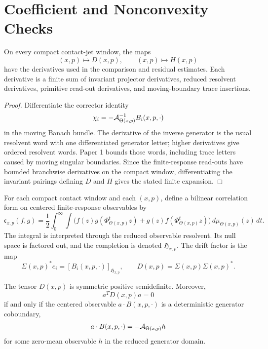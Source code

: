 \section{Coefficient and Nonconvexity Checks}

\begin{proposition}
\label{prop:supp_coefficient_differentiability}
On every compact contact-jet window, the maps
\[
  (x,p)\mapsto D(x,p),\qquad (x,p)\mapsto H(x,p)
\]
have the derivatives used in the comparison and residual estimates.  Each
derivative is a finite sum of invariant projector derivatives, reduced
resolvent derivatives, primitive read-out derivatives, and moving-boundary
trace insertions.
\end{proposition}

\begin{proof}
Differentiate the corrector identity
\[
  \chi_i=-\mathcal A_{\Theta(x,p)}^{-1}B_i(x,p,\cdot)
\]
in the moving Banach bundle.  The derivative of the inverse generator is the
usual resolvent word with one differentiated generator letter; higher
derivatives give ordered resolvent words.  Paper 1 bounds those words,
including trace letters caused by moving singular boundaries.  Since the
finite-response read-outs have bounded branchwise derivatives on the compact
window, differentiating the invariant pairings defining \(D\) and \(H\) gives
the stated finite expansion.
\end{proof}

\begin{definition}
\label{def:supp_correlation_hilbert_bundle}
For each compact contact window and each \((x,p)\), define a bilinear
correlation form on centered finite-response observables by
\[
  \mathfrak c_{x,p}(f,g)
  =
  \frac12\int_0^\infty
  \int \bigl(f(z)g(\Phi_{\Theta(x,p)}^t z)
      +g(z)f(\Phi_{\Theta(x,p)}^t z)\bigr)
  \,d\mu_{\Theta(x,p)}(z)\,dt .
\]
The integral is interpreted through the reduced observable resolvent.  Its null
space is factored out, and the completion is denoted
\(\mathfrak H_{x,p}\).  The drift factor is the map
\[
  \Sigma(x,p)^*e_i=[B_i(x,p,\cdot)]_{\mathfrak H_{x,p}},
  \qquad
  D(x,p)=\Sigma(x,p)\Sigma(x,p)^* .
\]
\end{definition}

\begin{lemma}
\label{lem:supp_gk_coboundary_kernel}
The tensor \(D(x,p)\) is symmetric positive semidefinite.  Moreover,
\[
  a^TD(x,p)a=0
\]
if and only if the centered observable \(a\cdot B(x,p,\cdot)\) is a
deterministic generator coboundary,
\[
  a\cdot B(x,p,\cdot)=-\mathcal A_{\Theta(x,p)}h
\]
for some zero-mean observable \(h\) in the reduced generator domain.
\end{lemma}

